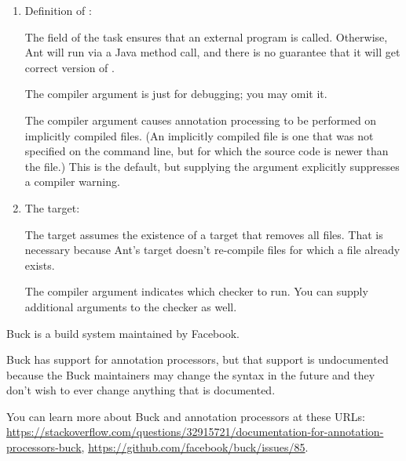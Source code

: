 \begin{enumerate}
\item Definition of :

The  field of the  task
ensures that an external  program is called.  Otherwise, Ant will run
 via a Java method call, and there is no guarantee that it will get
correct version of .

The  compiler argument is just for debugging; you may omit
it.

The  compiler argument causes annotation processing
to be performed on implicitly compiled files.  (An implicitly compiled file
is one that was not specified on the command line, but for which the source
code is newer than the  file.)  This is the default, but
supplying the argument explicitly suppresses a compiler warning.


\item The  target:

The target assumes the existence of a  target that removes all
 files.  That is necessary because Ant's  target
doesn't re-compile  files for which a  file
already exists.

The  compiler argument indicates which checker to
run.  You can supply additional arguments to the checker as well.

\end{enumerate}



Buck is a build system maintained by Facebook.

Buck has support for annotation processors, but that support is
undocumented because the Buck maintainers may change the syntax in the
future and they don't wish to ever change anything that is documented.

You can learn more about Buck and annotation processors at these URLs:
{\codesize\url{https://stackoverflow.com/questions/32915721/documentation-for-annotation-processors-buck}},
{\codesize\url{https://github.com/facebook/buck/issues/85}}.

